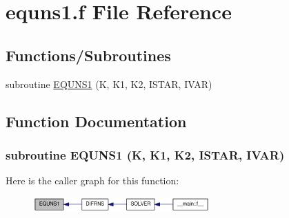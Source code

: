 \hypertarget{equns1_8f}{
\section{equns1.f File Reference}
\label{equns1_8f}
}
\subsection*{Functions/Subroutines}
\begin{DoxyCompactItemize}
\item 
subroutine \hyperlink{equns1_8f_abf556d5c1838b04eb21d8dfd876fbcd4}{EQUNS1} (K, K1, K2, ISTAR, IVAR)
\end{DoxyCompactItemize}


\subsection{Function Documentation}
\hypertarget{equns1_8f_abf556d5c1838b04eb21d8dfd876fbcd4}{
\subsubsection[{EQUNS1}]{\setlength{\rightskip}{0pt plus 5cm}subroutine EQUNS1 (K, \/  K1, \/  K2, \/  ISTAR, \/  IVAR)}}
\label{equns1_8f_abf556d5c1838b04eb21d8dfd876fbcd4}


Here is the caller graph for this function:\nopagebreak
\begin{figure}[H]
\begin{center}
\leavevmode
\includegraphics[width=192pt]{equns1_8f_abf556d5c1838b04eb21d8dfd876fbcd4_icgraph}
\end{center}
\end{figure}
